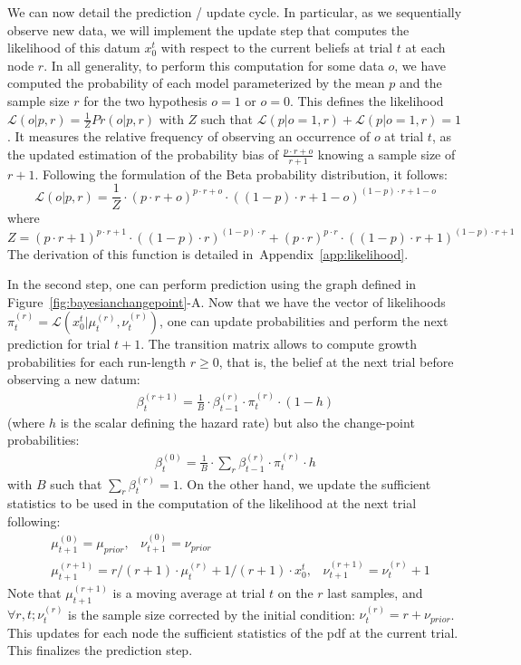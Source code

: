 \documentclass[12pt,english]{article}%
\newcommand{\eq}[1]{\begin{equation*}#1\end{equation*}}
\newcommand{\eql}[1]{\begin{equation}#1\end{equation}}
\newcommand{\eqa}[1]{\begin{align}#1\end{align}}
\newcommand{\Ll}{\mathcal{L}}
\newcommand{\seeFig}[1]{Figure~\ref{fig:#1}}
\newcommand{\seeApp}[1]{Appendix~\ref{app:#1}}
\begin{document}
We can now detail the prediction / update cycle.
In particular, as we sequentially observe new data,
we will  implement the update step that
computes the likelihood of this datum $x_0^t$ with respect to
the current beliefs at trial $t$ at each node $r$.
In all generality, to perform this computation for some data $o$,
we have computed the probability of each model
parameterized by the mean $p$ and the sample size $r$
for the two hypothesis $o=1$ or $o=0$.
This defines the likelihood
$\Ll(o | p, r) = \frac{1}{Z} Pr(o |p, r)$
with $Z$ such that $\Ll(p | o=1, r) + \Ll(p | o=1, r)=1$.
It measures the relative frequency of observing an occurrence of $o$ at trial $t$,
as the updated estimation of the probability bias of $\frac{p\cdot r + o}{r+1}$
knowing a sample size of $r+1$.
Following the formulation of the Beta probability distribution, it follows:
\eql{%
\Ll(o | p, r) = \frac{1}{Z} \cdot {(p\cdot r + o)}^{p\cdot r + o} \cdot {((1- p)\cdot r + 1- o)}^{(1- p)\cdot r + 1- o}
\label{eq:likelihood}
}
where
\eq{
Z = {(p\cdot r + 1)}^{p\cdot r + 1}  \cdot {((1- p)\cdot r )}^{(1- p)\cdot r }  +
    {(p\cdot r )}^{p\cdot r }  \cdot {((1- p)\cdot r + 1)}^{(1- p)\cdot r + 1}
}
The derivation of this function is detailed in~\seeApp{likelihood}.

In the second step, one can perform prediction
using the graph defined in \seeFig{bayesianchangepoint}-A.
Now that we have the vector of likelihoods $\pi^{(r)}_t=\Ll(x_0^t |  \mu^{(r)}_{t}, \nu^{(r)}_{t})$,
one can update probabilities and perform the next prediction for trial $t+1$.
The transition matrix %
allows to compute growth probabilities for each run-length $r \geq 0$, 
that is, the belief at the next trial before observing a new datum:
\eqa{
\beta^{(r+1)}_t = \frac{1}{B} \cdot \beta^{(r)}_{t-1} \cdot \pi^{(r)}_{t} \cdot (1-h)
}
(where $h$ is the scalar defining the hazard rate)
but also the change-point probabilities:
\eqa{
\beta^{(0)}_t  = \frac{1}{B} \cdot \sum_{r} \beta^{(r)}_{t-1} \cdot \pi^{(r)}_{t} \cdot h
}
with $B$ such that $\sum_{r} \beta^{(r)}_{t} = 1$.
On the other hand, we update the sufficient statistics to be used 
in the computation of the likelihood at the next trial following:
\eqa{
& \mu^{(0)}_{t+1} = \mu_{prior} \text{,} \quad \nu^{(0)}_{t+1} = \nu_{prior} \\
& \mu^{(r+1)}_{t+1} = r/(r+1) \cdot \mu^{(r)}_{t} + 1/(r+1) \cdot x_0^t \text{,} \quad \nu^{(r+1)}_{t+1} = \nu^{(r)}_{t} + 1
}
Note that $\mu^{(r+1)}_{t+1}$ is a moving average at trial $t$ on the $r$ last samples,
and $\forall r, t; \nu^{(r)}_{t}$ is the sample size corrected by the initial condition:
$\nu^{(r)}_{t} = r + \nu_{prior}$.
This updates for each node the sufficient statistics of the pdf at the current trial.
This finalizes the prediction step.
\end{document}

